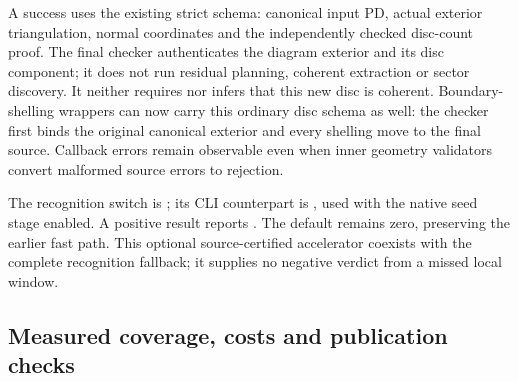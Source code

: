 A success uses the existing strict  schema:
canonical input PD, actual exterior triangulation, normal coordinates and
the independently checked disc-count proof. The final checker authenticates
the diagram exterior and its disc component; it does not run residual
planning, coherent extraction or sector discovery. It neither requires nor
infers that this new disc is coherent. Boundary-shelling wrappers can now
carry this ordinary disc schema as well: the checker first binds the
original canonical exterior and every shelling move to the final source.
Callback errors remain observable even when inner geometry validators
convert malformed source errors to rejection.

\begin{sloppypar}
The recognition switch is ; its CLI
counterpart is , used with the native
seed stage enabled. A positive result reports
. The default remains zero, preserving
the earlier fast path. This optional source-certified accelerator coexists
with the complete recognition fallback; it supplies no negative verdict
from a missed local window.
\end{sloppypar}

\subsection{Measured coverage, costs and publication checks}

